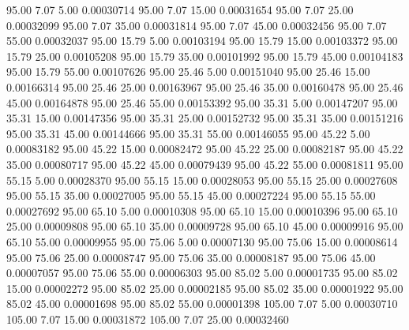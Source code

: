      95.00      7.07      5.00     0.00030714
     95.00      7.07     15.00     0.00031654
     95.00      7.07     25.00     0.00032099
     95.00      7.07     35.00     0.00031814
     95.00      7.07     45.00     0.00032456
     95.00      7.07     55.00     0.00032037
     95.00     15.79      5.00     0.00103194
     95.00     15.79     15.00     0.00103372
     95.00     15.79     25.00     0.00105208
     95.00     15.79     35.00     0.00101992
     95.00     15.79     45.00     0.00104183
     95.00     15.79     55.00     0.00107626
     95.00     25.46      5.00     0.00151040
     95.00     25.46     15.00     0.00166314
     95.00     25.46     25.00     0.00163967
     95.00     25.46     35.00     0.00160478
     95.00     25.46     45.00     0.00164878
     95.00     25.46     55.00     0.00153392
     95.00     35.31      5.00     0.00147207
     95.00     35.31     15.00     0.00147356
     95.00     35.31     25.00     0.00152732
     95.00     35.31     35.00     0.00151216
     95.00     35.31     45.00     0.00144666
     95.00     35.31     55.00     0.00146055
     95.00     45.22      5.00     0.00083182
     95.00     45.22     15.00     0.00082472
     95.00     45.22     25.00     0.00082187
     95.00     45.22     35.00     0.00080717
     95.00     45.22     45.00     0.00079439
     95.00     45.22     55.00     0.00081811
     95.00     55.15      5.00     0.00028370
     95.00     55.15     15.00     0.00028053
     95.00     55.15     25.00     0.00027608
     95.00     55.15     35.00     0.00027005
     95.00     55.15     45.00     0.00027224
     95.00     55.15     55.00     0.00027692
     95.00     65.10      5.00     0.00010308
     95.00     65.10     15.00     0.00010396
     95.00     65.10     25.00     0.00009808
     95.00     65.10     35.00     0.00009728
     95.00     65.10     45.00     0.00009916
     95.00     65.10     55.00     0.00009955
     95.00     75.06      5.00     0.00007130
     95.00     75.06     15.00     0.00008614
     95.00     75.06     25.00     0.00008747
     95.00     75.06     35.00     0.00008187
     95.00     75.06     45.00     0.00007057
     95.00     75.06     55.00     0.00006303
     95.00     85.02      5.00     0.00001735
     95.00     85.02     15.00     0.00002272
     95.00     85.02     25.00     0.00002185
     95.00     85.02     35.00     0.00001922
     95.00     85.02     45.00     0.00001698
     95.00     85.02     55.00     0.00001398
    105.00      7.07      5.00     0.00030710
    105.00      7.07     15.00     0.00031872
    105.00      7.07     25.00     0.00032460
